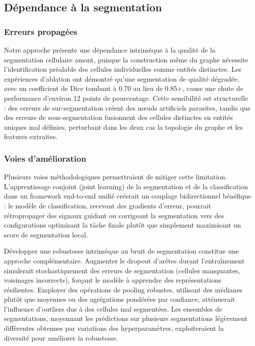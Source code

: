 \subsection{Dépendance à la segmentation}

\subsubsection{Erreurs propagées}

Notre approche présente une dépendance intrinsèque à la qualité de la segmentation cellulaire amont, puisque la construction même du graphe nécessite l'identification préalable des cellules individuelles comme entités distinctes. Les expériences d'ablation ont démontré qu'une segmentation de qualité dégradée, avec un coefficient de Dice tombant à 0.70 au lieu de 0.85+, cause une chute de performance d'environ 12 points de pourcentage. Cette sensibilité est structurelle : des erreurs de sur-segmentation créent des nœuds artificiels parasites, tandis que des erreurs de sous-segmentation fusionnent des cellules distinctes en entités uniques mal définies, perturbant dans les deux cas la topologie du graphe et les features extraites.

\subsubsection{Voies d'amélioration}

Plusieurs voies méthodologiques permettraient de mitiger cette limitation. L'apprentissage conjoint (joint learning) de la segmentation et de la classification dans un framework end-to-end unifié créerait un couplage bidirectionnel bénéfique : le modèle de classification, recevant des gradients d'erreur, pourrait rétropropager des signaux guidant ou corrigeant la segmentation vers des configurations optimisant la tâche finale plutôt que simplement maximisant un score de segmentation local.

Développer une robustesse intrinsèque au bruit de segmentation constitue une approche complémentaire. Augmenter le dropout d'arêtes durant l'entraînement simulerait stochastiquement des erreurs de segmentation (cellules manquantes, voisinages incorrects), forçant le modèle à apprendre des représentations résilientes. Employer des opérations de pooling robustes, utilisant des médianes plutôt que moyennes ou des agrégations pondérées par confiance, atténuerait l'influence d'outliers dus à des cellules mal segmentées. Les ensembles de segmentations, moyennant les prédictions sur plusieurs segmentations légèrement différentes obtenues par variations des hyperparamètres, exploiteraient la diversité pour améliorer la robustesse.

